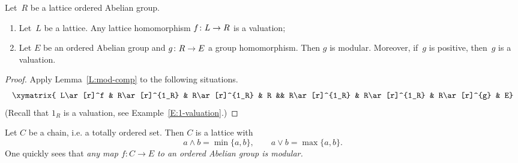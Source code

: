 \documentclass[main.tex]{subfiles}
\begin{document}
\begin{cor}
\label{C:hom-val}
Let~$R$ be a lattice ordered Abelian group.
\begin{enumerate}
\item
\label{C:hom-val-lat}
Let~$L$ be a lattice.
Any lattice homomorphism $f\colon L\rightarrow R$ 
is a valuation;

\item
\label{C:hom-val-group}
Let $E$ be an ordered Abelian group
and $g\colon R\rightarrow E$ a group homomorphism.
Then $g$ is modular.
Moreover,
if~$g$ is positive,
then~$g$ is a valuation.
\end{enumerate}
\end{cor}
\begin{proof}
Apply Lemma~\ref{L:mod-comp} to the following situations.
\begin{equation*}
\xymatrix{
L\ar[r]^f &
R\ar[r]^{1_R} &
R\ar[r]^{1_R} &
R &&
R\ar[r]^{1_R} &
R\ar[r]^{1_R} &
R\ar[r]^{g} &
E}
\end{equation*}
(Recall that $1_R$ is a valuation,
see Example~\ref{E:1-valuation}.)
\end{proof}


\begin{ex}
Let $C$ be a chain,
i.e. a totally ordered set.
Then $C$ is a lattice with
\begin{equation*}
a\wedge b = \min\{a,b\},
 \qquad 
a\vee b = \max\{a,b\}.
\end{equation*}
One quickly sees that
\emph{any map $f\colon C\rightarrow E$
to an ordered Abelian group is modular.}
\end{ex}
\end{document}
